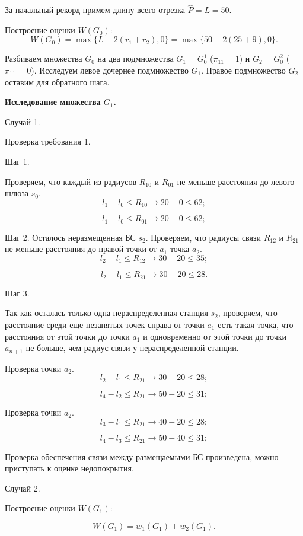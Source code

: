 За начальный рекорд примем длину всего отрезка $\widehat{P} = L = 50$.

Построение оценки $W(G_0)$:
$$
W(G_0)= \max\{L-2(r_1 + r_2), 0\} = \max\{50 -2(25+9), 0 \}.
$$

Разбиваем множества $G_0$ на два подмножества $G_1 = G^1_0$ ($\pi_{11} = 1$) и $G_2 = G^2_0$ ($\pi_{11} = 0$). Исследуем левое дочернее подмножество $G_1$. Правое подмножество $G_2$ оставим для обратного шага.

\textbf{Исследование множества $G_1$.}

Случай 1.

Проверка требования 1.

Шаг 1.

Проверяем, что каждый из радиусов $R_{10}$ и $R_{01}$ не меньше расстояния  до левого шлюза $s_0$. 
$$
l_1 - l_0 \leqslant R_{10} \rightarrow 20 - 0 \leqslant 62;
$$

$$
l_1 - l_0 \leqslant R_{01} \rightarrow 20 - 0 \leqslant 62;
$$

Шаг 2.
Осталось неразмещенная БС $s_2$. Проверяем, что радиусы связи $R_{12}$ и $R_{21}$ не меньше расстояния до правой точки от $a_1$ точка $a_2$.
$$
l_2 - l_1 \leqslant R_{12} \rightarrow 30 - 20 \leqslant 35;
$$

$$
l_2 - l_1 \leqslant R_{21} \rightarrow 30 - 20 \leqslant 28.
$$

Шаг 3.

Так как осталась только одна нераспределенная станция $s_2$, проверяем, что расстояние среди еще незанятых точек справа от точки $a_1$  есть такая точка, что расстояния от этой точки до точки $a_1$ и одновременно от этой точки до точки $a_{n+1}$ не больше, чем  радиус связи у нераспределенной станции.

Проверка точки $a_2$.
$$
l_2 - l_1 \leqslant R_{21} \rightarrow 30 - 20 \leqslant  28;
$$

$$
l_4 - l_2 \leqslant R_{21} \rightarrow 50 - 20 \leqslant  31;
$$

Проверка точки $a_2$.
$$
l_3 - l_1 \leqslant R_{21} \rightarrow 40 - 20 \leqslant  28;
$$

$$
l_4 - l_3 \leqslant R_{21} \rightarrow 50 - 40 \leqslant  31;
$$

Проверка обеспечения связи между размещаемыми БС произведена, можно приступать к оценке недопокрытия.

Случай 2.

Построение оценки $W(G_1)$:

$$
W(G_1) = w_1(G_1) + w_2(G_1).
$$

